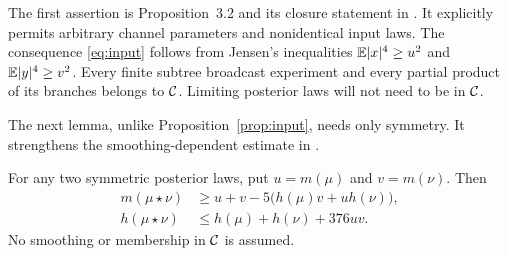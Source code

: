 The first assertion is Proposition~3.2 and its closure statement in
\cite{OAIThreshold}. It explicitly permits arbitrary channel parameters and
nonidentical input laws. The consequence \eqref{eq:input} follows from
Jensen's inequalities $\mathbb E|x|^4\ge u^2$ and $\mathbb E|y|^4\ge v^2$. Every finite
subtree broadcast experiment and every partial product of its branches
belongs to $\mathcal C$. Limiting posterior laws will not need to be in $\mathcal C$.

The next lemma, unlike Proposition~\ref{prop:input}, needs only symmetry.
It strengthens the smoothing-dependent estimate in
\cite[Lemma~4.1]{OAICapacity}.

\begin{lemma}\label{lem:local}
For any two symmetric posterior laws, put $u=m(\mu)$ and $v=m(\nu)$. Then
\begin{align}
 m(\mu\star\nu)
 &\ge u+v-5\bigl(h(\mu)v+u h(\nu)\bigr),\label{eq:mlower}\\
 h(\mu\star\nu)
 &\le h(\mu)+h(\nu)+376uv.\label{eq:hupper}
\end{align}
No smoothing or membership in $\mathcal C$ is assumed.
\end{lemma}


